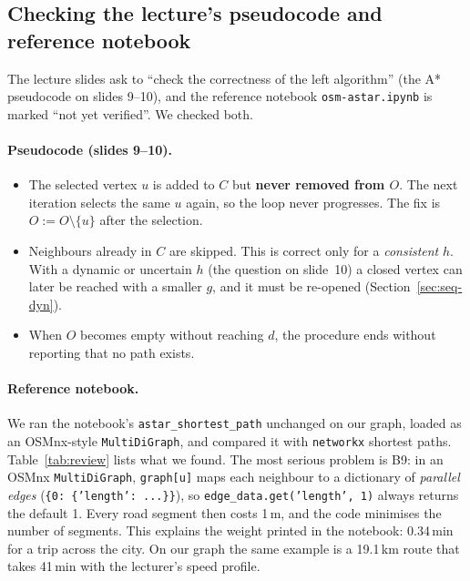 \subsection{Checking the lecture's pseudocode and reference notebook}
\label{sec:review}

The lecture slides ask to ``check the correctness of the left algorithm'' (the
A* pseudocode on slides 9--10), and the reference notebook
\texttt{osm-astar.ipynb} is marked ``not yet verified''. We checked both.

\paragraph{Pseudocode (slides 9--10).}
\begin{itemize}[nosep]
  \item The selected vertex $u$ is added to $C$ but \textbf{never removed from
        $O$}. The next iteration selects the same $u$ again, so the loop never
        progresses. The fix is $O := O \setminus \{u\}$ after the selection.
  \item Neighbours already in $C$ are skipped. This is correct only for a
        \emph{consistent} $h$. With a dynamic or uncertain $h$ (the question on
        slide~10) a closed vertex can later be reached with a smaller
        $g$, and it must be re-opened (Section~\ref{sec:seq-dyn}).
  \item When $O$ becomes empty without reaching $d$, the procedure ends
        without reporting that no path exists.
\end{itemize}

\paragraph{Reference notebook.} We ran the notebook's
\texttt{astar\_shortest\_path} unchanged on our graph, loaded as an OSMnx-style
\texttt{MultiDiGraph}, and compared it with \texttt{networkx} shortest paths.
Table~\ref{tab:review} lists what we found. The most serious problem is B9: in
an OSMnx \texttt{MultiDiGraph}, \texttt{graph[u]} maps each neighbour to a
dictionary of \emph{parallel edges} (\texttt{\{0: \{'length': ...\}\}}), so
\texttt{edge\_data.get('length', 1)} always returns the default 1. Every road
segment then costs 1\,m, and the code minimises the number of segments. This
explains the weight printed in the notebook: 0.34\,min for a trip across the
city. On our graph the same example is a 19.1\,km route that takes 41\,min with
the lecturer's speed profile.

